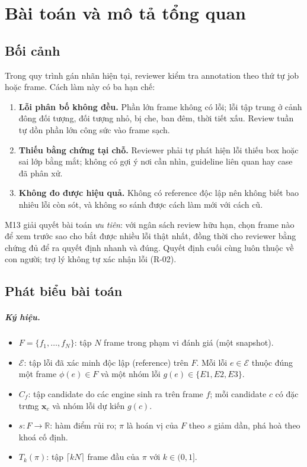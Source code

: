 \chapter{Bài toán và mô tả tổng quan}
\label{ch:overview}

\section{Bối cảnh}
Trong quy trình gán nhãn hiện tại, reviewer kiểm tra annotation theo thứ tự job
hoặc frame. Cách làm này có ba hạn chế:

\begin{enumerate}
  \item \textbf{Lỗi phân bố không đều.} Phần lớn frame không có lỗi; lỗi tập
        trung ở cảnh đông đối tượng, đối tượng nhỏ, bị che, ban đêm, thời tiết
        xấu. Review tuần tự dồn phần lớn công sức vào frame sạch.
  \item \textbf{Thiếu bằng chứng tại chỗ.} Reviewer phải tự phát hiện lỗi thiếu
        box hoặc sai lớp bằng mắt; không có gợi ý nơi cần nhìn, guideline liên
        quan hay case đã phân xử.
  \item \textbf{Không đo được hiệu quả.} Không có reference độc lập nên không
        biết bao nhiêu lỗi còn sót, và không so sánh được cách làm mới với cách cũ.
\end{enumerate}

M13 giải quyết bài toán \emph{ưu tiên}: với ngân sách review hữu hạn, chọn
frame nào để xem trước sao cho bắt được nhiều lỗi thật nhất, đồng thời cho
reviewer bằng chứng đủ để ra quyết định nhanh và đúng. Quyết định cuối cùng
luôn thuộc về con người; trợ lý không tự xác nhận lỗi (R-02).

\section{Phát biểu bài toán}
\label{sec:problem}

\paragraph{Ký hiệu.}
\begin{itemize}
  \item \(F = \{f_1, \dots, f_N\}\): tập \(N\) frame trong phạm vi đánh giá (một snapshot).
  \item \(\mathcal{E}\): tập lỗi đã xác minh độc lập (reference) trên \(F\). Mỗi
        lỗi \(e \in \mathcal{E}\) thuộc đúng một frame \(\phi(e) \in F\) và một
        nhóm lỗi \(g(e) \in \{E1, E2, E3\}\).
  \item \(C_f\): tập candidate do các engine sinh ra trên frame \(f\); mỗi
        candidate \(c\) có đặc trưng \(\mathbf{x}_c\) và nhóm lỗi dự kiến \(g(c)\).
  \item \(s: F \to \mathbb{R}\): hàm điểm rủi ro; \(\pi\) là hoán vị của \(F\)
        theo \(s\) giảm dần, phá hoà theo khoá cố định.
  \item \(T_k(\pi)\): tập \(\lceil kN \rceil\) frame đầu của \(\pi\) với \(k \in (0,1]\).
\end{itemize}

